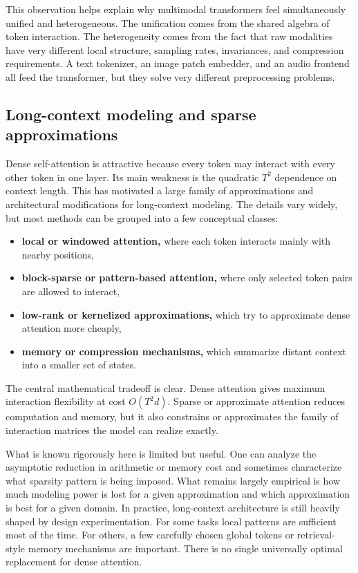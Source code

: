 This observation helps explain why multimodal transformers feel simultaneously unified and heterogeneous.
The unification comes from the shared algebra of token interaction.
The heterogeneity comes from the fact that raw modalities have very different local structure, sampling rates, invariances, and compression requirements.
A text tokenizer, an image patch embedder, and an audio frontend all feed the transformer, but they solve very different preprocessing problems.

\subsection*{Long-context modeling and sparse approximations}

Dense self-attention is attractive because every token may interact with every other token in one layer.
Its main weakness is the quadratic \(T^2\) dependence on context length.
This has motivated a large family of approximations and architectural modifications for long-context modeling.
The details vary widely, but most methods can be grouped into a few conceptual classes:
\begin{itemize}
    \item \textbf{local or windowed attention,} where each token interacts mainly with nearby positions,
    \item \textbf{block-sparse or pattern-based attention,} where only selected token pairs are allowed to interact,
    \item \textbf{low-rank or kernelized approximations,} which try to approximate dense attention more cheaply,
    \item \textbf{memory or compression mechanisms,} which summarize distant context into a smaller set of states.
\end{itemize}

The central mathematical tradeoff is clear.
Dense attention gives maximum interaction flexibility at cost \(O(T^2 d)\).
Sparse or approximate attention reduces computation and memory, but it also constrains or approximates the family of interaction matrices the model can realize exactly.

What is known rigorously here is limited but useful.
One can analyze the asymptotic reduction in arithmetic or memory cost and sometimes characterize what sparsity pattern is being imposed.
What remains largely empirical is how much modeling power is lost for a given approximation and which approximation is best for a given domain.
In practice, long-context architecture is still heavily shaped by design experimentation.
For some tasks local patterns are sufficient most of the time.
For others, a few carefully chosen global tokens or retrieval-style memory mechanisms are important.
There is no single universally optimal replacement for dense attention.


